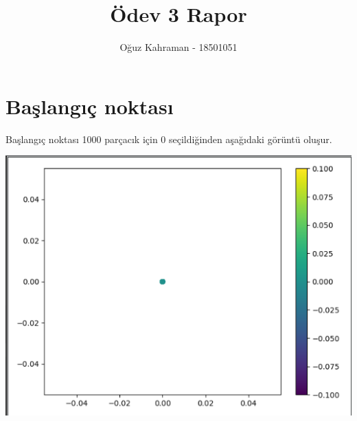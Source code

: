 \documentclass{article}
\title{Ödev 3 Rapor}
\author{Oğuz Kahraman - 18501051}
\begin{document}
	\maketitle

	\section{Başlangıç noktası}
	Başlangıç noktası 1000 parçacık için 0 seçildiğinden aşağıdaki görüntü oluşur.
	\begin{center}
		\includegraphics[scale=0.8]{startpoint}
	\end{center}
\end{document}
